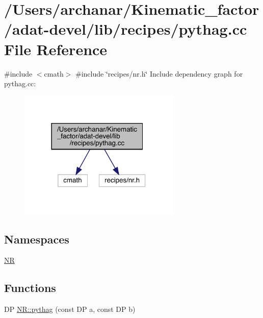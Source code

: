 \hypertarget{adat-devel_2lib_2recipes_2pythag_8cc}{}\section{/\+Users/archanar/\+Kinematic\+\_\+factor/adat-\/devel/lib/recipes/pythag.cc File Reference}
\label{adat-devel_2lib_2recipes_2pythag_8cc}
{\ttfamily \#include $<$cmath$>$}\newline
{\ttfamily \#include \char`\"{}recipes/nr.\+h\char`\"{}}\newline
Include dependency graph for pythag.\+cc\+:
\nopagebreak
\begin{figure}[H]
\begin{center}
\leavevmode
\includegraphics[width=218pt]{d9/d1d/adat-devel_2lib_2recipes_2pythag_8cc__incl}
\end{center}
\end{figure}
\subsection*{Namespaces}
\begin{DoxyCompactItemize}
\item 
 \mbox{\hyperlink{namespaceNR}{NR}}
\end{DoxyCompactItemize}
\subsection*{Functions}
\begin{DoxyCompactItemize}
\item 
DP \mbox{\hyperlink{namespaceNR_a4794ff6d4eaeeedd85a91698287cd7ac}{N\+R\+::pythag}} (const DP a, const DP b)
\end{DoxyCompactItemize}
